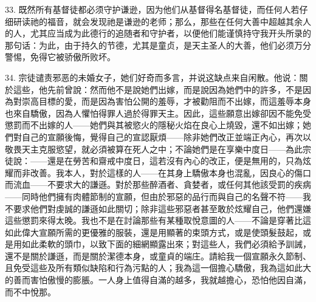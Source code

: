 33. 既然所有基督徒都必须守护谦逊，因为他们从基督得名基督徒，而任何人若仔细研读祂的福音，就会发现祂是谦逊的老师；那么，那些在任何大善中超越其余人的人，尤其应当成为此德行的追随者和守护者，以便他们能谨慎持守我开头所录的那句话：为此，由于持久的节德，尤其是童贞，是天主圣人的大善，他们必须万分警惕，免得它被骄傲所败坏。\par

34. 宗徒谴责邪恶的未婚女子，她们好奇而多言，并说这缺点来自闲散。他说：關於這些，他先前曾說：然而他不是說她們出嫁，而是說因為她們中的許多，不是因為對崇高目標的愛，而是因為害怕公開的羞辱，才被勸阻而不出嫁，而這羞辱本身也來自驕傲，因為人懼怕得罪人過於得罪天主。因此，這些願意出嫁卻因不能免受懲罰而不出嫁的人——她們與其被慾火的隱秘火焰在良心上燒毀，還不如出嫁；她們對自己的宣願後悔，覺得自己的宣認厭煩——除非她們改正並端正內心，再次以敬畏天主克服慾望，就必須被算在死人之中；不論她們是在享樂中度日——為此宗徒說：——還是在勞苦和齋戒中度日，這若沒有內心的改正，便是無用的，只為炫耀而非改善。我本人，對於這樣的人——在其身上驕傲本身也混亂，因良心的傷口而流血——不要求大的謙遜。對於那些醉酒者、貪婪者，或任何其他該受罰的疾病——同時他們擁有肉體節制的宣願，但由於邪惡的品行而與自己的名聲不符——我不要求他們對虔誠的謙遜如此關切；除非這些邪惡者甚至敢於炫耀自己，他們還嫌這些懲罰來得太晚。我也不是在討論那些有某種取悅意圖的人——不論是穿著比這如此偉大宣願所需的更優雅的服裝，還是用顯著的束頭方式，或是使頭髮鼓起，或是用如此柔軟的頭巾，以致下面的細網顯露出來；對這些人，我們必須給予訓誡，還不是關於謙遜，而是關於潔德本身，或童貞的端庄。請給我一個宣願永久節制、且免受這些及所有類似缺陷和行為污點的人；我為這一個擔心驕傲，我為這如此大的善而害怕傲慢的膨脹。一人身上值得自滿的越多，我就越擔心，恐怕他因自滿，而不中悅那。\par

